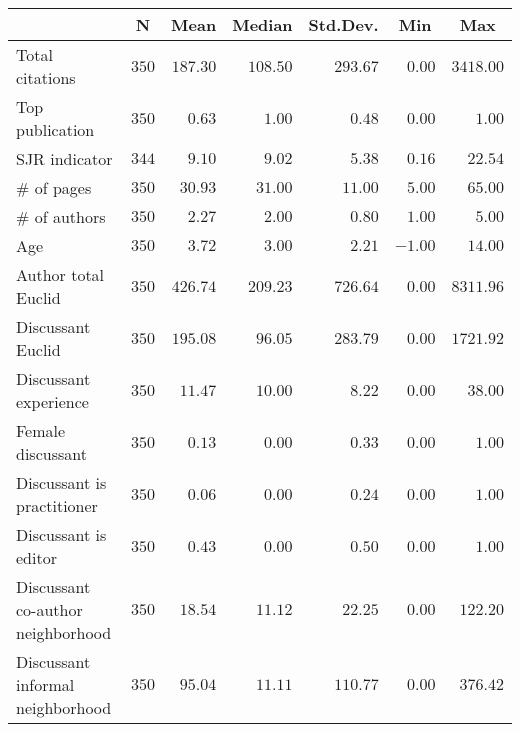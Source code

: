 \begin{center}
\begin{tabular}{lrrrrrr}
\toprule
\multicolumn{1}{l}{}&\multicolumn{1}{c}{N}&\multicolumn{1}{c}{Mean}&\multicolumn{1}{c}{Median}&\multicolumn{1}{c}{Std.Dev.}&\multicolumn{1}{c}{Min}&\multicolumn{1}{c}{Max}\tabularnewline
\midrule
Total citations&$350$&$187.30$&$108.50$&$293.67$&$ 0.00$&$3418.00$\tabularnewline
Top publication&$350$&$  0.63$&$  1.00$&$  0.48$&$ 0.00$&$   1.00$\tabularnewline
SJR indicator&$344$&$  9.10$&$  9.02$&$  5.38$&$ 0.16$&$  22.54$\tabularnewline
\# of pages&$350$&$ 30.93$&$ 31.00$&$ 11.00$&$ 5.00$&$  65.00$\tabularnewline
\# of authors&$350$&$  2.27$&$  2.00$&$  0.80$&$ 1.00$&$   5.00$\tabularnewline
Age&$350$&$  3.72$&$  3.00$&$  2.21$&$-1.00$&$  14.00$\tabularnewline
Author total Euclid&$350$&$426.74$&$209.23$&$726.64$&$ 0.00$&$8311.96$\tabularnewline
Discussant Euclid&$350$&$195.08$&$ 96.05$&$283.79$&$ 0.00$&$1721.92$\tabularnewline
Discussant experience&$350$&$ 11.47$&$ 10.00$&$  8.22$&$ 0.00$&$  38.00$\tabularnewline
Female discussant&$350$&$  0.13$&$  0.00$&$  0.33$&$ 0.00$&$   1.00$\tabularnewline
Discussant is practitioner&$350$&$  0.06$&$  0.00$&$  0.24$&$ 0.00$&$   1.00$\tabularnewline
Discussant is editor&$350$&$  0.43$&$  0.00$&$  0.50$&$ 0.00$&$   1.00$\tabularnewline
Discussant co-author neighborhood&$350$&$ 18.54$&$ 11.12$&$ 22.25$&$ 0.00$&$ 122.20$\tabularnewline
Discussant informal neighborhood&$350$&$ 95.04$&$ 11.11$&$110.77$&$ 0.00$&$ 376.42$\tabularnewline
\bottomrule
\end{tabular}\end{center}
